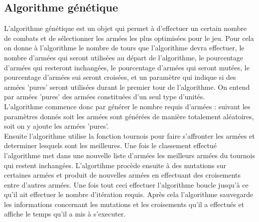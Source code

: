 \subsection{Algorithme génétique}
L'algorithme génétique est un objet qui permet à d'effectuer un certain nombre de combats et de sélectionner les armées les plus optimisées pour le jeu. Pour cela on donne à l'algorithme le nombre de tours que l'algorithme devra effectuer, le nombre d'armées qui seront utilisées au départ de l'algorithme, le pourcentage d'armées qui resteront inchangées, le pourcentage d'armées qui seront mutées, le pourcentage d'armées sui seront croisées, et un paramètre qui indique si des armées 'pures' seront utilisées durant le premier tour de l'algorithme. On entend par armées 'pures' des armées constituées d'un seul type d'unités. \\
L'algorithme commence donc par générer le nombre requis d'armées : suivant les paramètres donnés soit les armées sont générées de manière totalement aléatoires, soit on y ajoute les armées 'pures'. \\
Ensuite l'algorithme utilise la fonction tournois pour faire s'affronter les armées et determiner lesquels sont les meilleures. Une fois le classement effectué l'algorithme met dans une nouvelle liste d'armées les meilleurs armées du tournois qui restent inchangées. L'algortihme procède ensuite à des mutations sur certaines armées et produit de nouvelles armées en effectuant des croisements entre d'autres armées. Une fois tout ceci effectuer l'algorithme boucle jusqu'à ce qu'il ait effectuer le nombre d'itération requis. Après cela l'algorithme sauvegarde les informations concernant les mutations et  les croisements qu'il a effectués et affiche le temps qu'il a mis à s'executer.